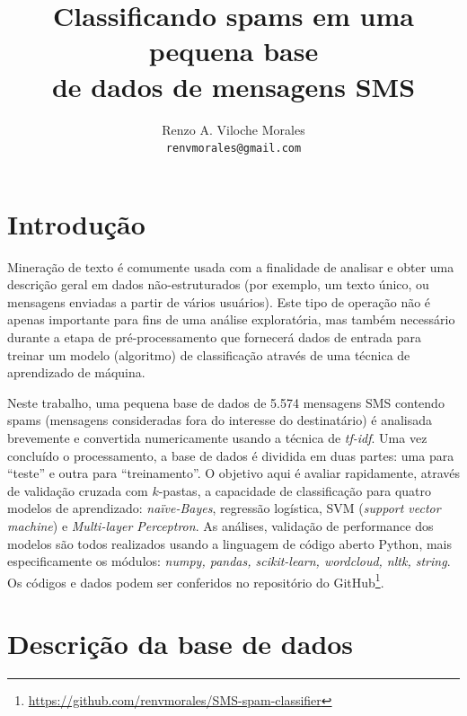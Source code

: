 \documentclass[a4paper,11pt]{article}
\title{ Classificando spams em uma pequena base \\ de dados de mensagens SMS}
\author{Renzo A. Viloche Morales \\ \texttt{renvmorales@gmail.com}}
\begin{document}
\maketitle

\section{Introdução}

Mineração de texto é comumente usada com a finalidade de analisar e obter uma descrição geral em 
dados não-estruturados (por exemplo, um texto único, ou mensagens enviadas a partir de vários 
usuários). Este tipo de operação não é apenas importante para fins de uma análise exploratória, 
mas também necessário durante a etapa de pré-processamento que fornecerá dados de entrada para 
treinar um modelo (algoritmo) de classificação através de uma técnica de aprendizado de máquina. 

Neste trabalho, uma pequena base de dados de 5.574 mensagens SMS contendo spams (mensagens 
consideradas fora do interesse do destinatário) é analisada brevemente e convertida numericamente 
usando a técnica de \textit{tf-idf}. Uma vez concluído o processamento, a base de dados é dividida 
em duas partes: uma para ``teste'' e outra para ``treinamento''. O objetivo aqui é avaliar 
rapidamente, através de validação cruzada com $k$-pastas, a capacidade de classificação para 
quatro modelos de aprendizado: \textit{naïve-Bayes}, regressão logística, SVM (\textit{support 
vector machine}) e \textit{Multi-layer Perceptron}. As análises, validação de performance dos 
modelos são todos realizados usando a linguagem de código aberto Python, mais especificamente os 
módulos: \textit{numpy, pandas, scikit-learn, wordcloud, nltk, string}. Os códigos e dados podem 
ser conferidos no repositório do GitHub\footnote{\url{https://github.com/renvmorales/SMS-spam-classifier}}.







\section{Descrição da base de dados}
\end{document}
